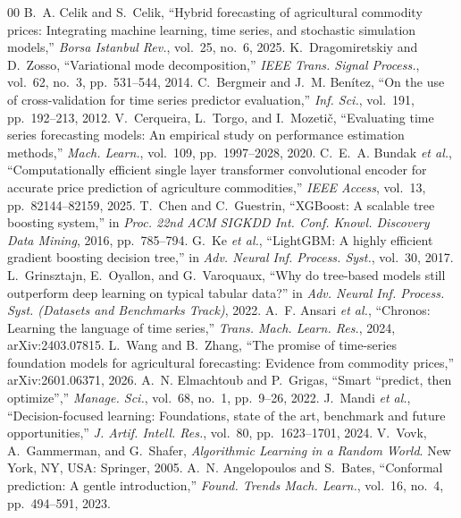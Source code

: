 \documentclass{ieeeaccess}
\begin{document}
\begin{thebibliography}{00}
 B.~A. Celik and S.~Celik, ``Hybrid forecasting of agricultural commodity prices: Integrating machine learning, time series, and stochastic simulation models,'' \emph{Borsa Istanbul Rev.}, vol.~25, no.~6, 2025.
 K.~Dragomiretskiy and D.~Zosso, ``Variational mode decomposition,'' \emph{IEEE Trans. Signal Process.}, vol.~62, no.~3, pp.~531--544, 2014.
 C.~Bergmeir and J.~M. Ben\'{i}tez, ``On the use of cross-validation for time series predictor evaluation,'' \emph{Inf. Sci.}, vol.~191, pp.~192--213, 2012.
 V.~Cerqueira, L.~Torgo, and I.~Mozeti\v{c}, ``Evaluating time series forecasting models: An empirical study on performance estimation methods,'' \emph{Mach. Learn.}, vol.~109, pp.~1997--2028, 2020.
 C.~E.~A. Bundak \emph{et al.}, ``Computationally efficient single layer transformer convolutional encoder for accurate price prediction of agriculture commodities,'' \emph{IEEE Access}, vol.~13, pp.~82144--82159, 2025.
 T.~Chen and C.~Guestrin, ``XGBoost: A scalable tree boosting system,'' in \emph{Proc. 22nd ACM SIGKDD Int. Conf. Knowl. Discovery Data Mining}, 2016, pp.~785--794.
 G.~Ke \emph{et al.}, ``LightGBM: A highly efficient gradient boosting decision tree,'' in \emph{Adv. Neural Inf. Process. Syst.}, vol.~30, 2017.
 L.~Grinsztajn, E.~Oyallon, and G.~Varoquaux, ``Why do tree-based models still outperform deep learning on typical tabular data?'' in \emph{Adv. Neural Inf. Process. Syst. (Datasets and Benchmarks Track)}, 2022.
 A.~F. Ansari \emph{et al.}, ``Chronos: Learning the language of time series,'' \emph{Trans. Mach. Learn. Res.}, 2024, arXiv:2403.07815.
 L.~Wang and B.~Zhang, ``The promise of time-series foundation models for agricultural forecasting: Evidence from commodity prices,'' arXiv:2601.06371, 2026.
 A.~N. Elmachtoub and P.~Grigas, ``Smart ``predict, then optimize'','' \emph{Manage. Sci.}, vol.~68, no.~1, pp.~9--26, 2022.
 J.~Mandi \emph{et al.}, ``Decision-focused learning: Foundations, state of the art, benchmark and future opportunities,'' \emph{J. Artif. Intell. Res.}, vol.~80, pp.~1623--1701, 2024.
 V.~Vovk, A.~Gammerman, and G.~Shafer, \emph{Algorithmic Learning in a Random World}. New York, NY, USA: Springer, 2005.
 A.~N. Angelopoulos and S.~Bates, ``Conformal prediction: A gentle introduction,'' \emph{Found. Trends Mach. Learn.}, vol.~16, no.~4, pp.~494--591, 2023.

\end{thebibliography}
\end{document}
